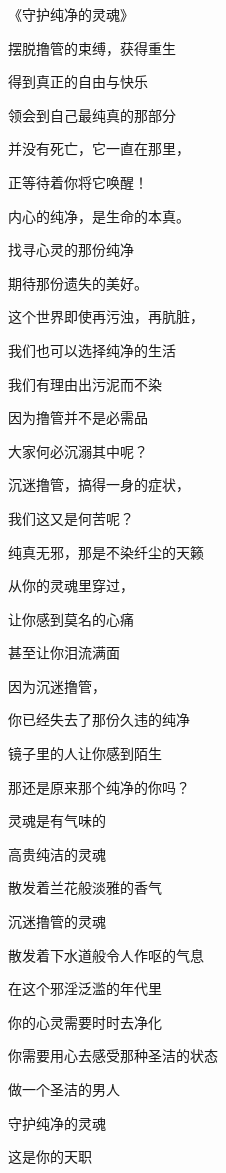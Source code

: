\begin{center}
    《守护纯净的灵魂》\it
    \begin{multicols}{2}
        摆脱撸管的束缚，获得重生

        得到真正的自由与快乐

        领会到自己最纯真的那部分

        并没有死亡，它一直在那里，

        正等待着你将它唤醒！

        内心的纯净，是生命的本真。

        找寻心灵的那份纯净

        期待那份遗失的美好。

        这个世界即使再污浊，再肮脏，

        我们也可以选择纯净的生活

        我们有理由出污泥而不染

        因为撸管并不是必需品

        大家何必沉溺其中呢？

        沉迷撸管，搞得一身的症状，

        我们这又是何苦呢？

        纯真无邪，那是不染纤尘的天籁

        从你的灵魂里穿过，

        让你感到莫名的心痛

        甚至让你泪流满面

        因为沉迷撸管，

        你已经失去了那份久违的纯净

        镜子里的人让你感到陌生

        那还是原来那个纯净的你吗？

        灵魂是有气味的

        高贵纯洁的灵魂

        散发着兰花般淡雅的香气

        沉迷撸管的灵魂

        散发着下水道般令人作呕的气息

        在这个邪淫泛滥的年代里

        你的心灵需要时时去净化

        你需要用心去感受那种圣洁的状态

        做一个圣洁的男人

        守护纯净的灵魂

        这是你的天职
    \end{multicols}
\end{center}

